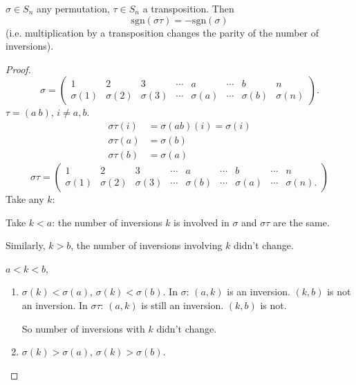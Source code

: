 \documentclass[10pt, a4paper]{article}
\begin{document}
\begin{lemma}
    $\sigma \in S_n$ any permutation,
    $\tau \in S_n$ a transposition.
    Then
    \[
    \mathrm{sgn}(\sigma\tau) = -\mathrm{sgn}(\sigma)
    \]
    (i.e. multiplication by a transposition changes the parity of the number of inversions).

    \begin{proof}
        \[
        \sigma = \begin{pmatrix}
            1 & 2 & 3 & \dotsi & a & \dotsi & b & n  \\
            \sigma(1) & \sigma(2) & \sigma(3) & \dotsi & \sigma(a) & \dotsi & \sigma(b) & \sigma(n)
        \end{pmatrix}.
        \]
        $\tau = (a\ b)$,
        $i \neq a, b$.
        \begin{align*}
            \sigma\tau(i) &= \sigma(ab)(i) = \sigma(i) \\
            \sigma\tau(a) &= \sigma(b) \\
            \sigma\tau(b) &= \sigma(a)
        \end{align*}
        \[
        \sigma\tau = \begin{pmatrix}
            1 & 2 & 3 & \dotsi & a & \dotsi & b & \dotsi & n \\
            \sigma(1) & \sigma(2) & \sigma(3) & \dotsi & \sigma(b) & \dotsi & \sigma(a) & \dotsi & \sigma(n).
        \end{pmatrix}
        \]
        Take any $k$:
        
        Take $k < a$:
        the number of inversions $k$ is involved in $\sigma$ and $\sigma\tau$ are the same.

        Similarly,
        $k > b$,
        the number of inversions involving $k$ didn't change.

        $a < k < b$,
        \begin{enumerate}[label = (\alph*)]
            \item $\sigma(k) < \sigma(a)$,
            $\sigma(k) < \sigma(b)$.
            In $\sigma$:
            $(a, k)$ is an inversion.
            $(k, b)$ is not an inversion.
            In $\sigma\tau$:
            $(a, k)$ is still an inversion.
            $(k, b)$ is not.

            So number of inversions with $k$ didn't change.

            \item $\sigma(k) > \sigma(a)$,
            $\sigma(k) > \sigma(b)$.


\end{enumerate}
\end{proof}
\end{lemma}
\end{document}
